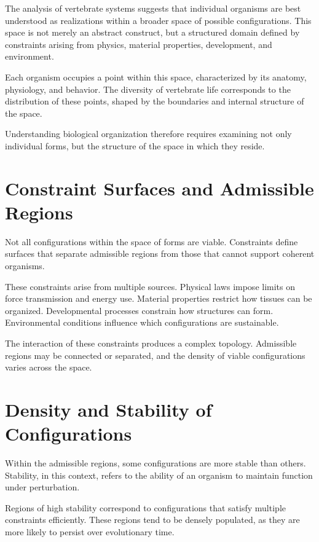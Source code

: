 \documentclass[11pt,oneside]{book}
\begin{document}
The analysis of vertebrate systems suggests that individual organisms are best understood as realizations within a broader space of possible configurations. This space is not merely an abstract construct, but a structured domain defined by constraints arising from physics, material properties, development, and environment.

Each organism occupies a point within this space, characterized by its anatomy, physiology, and behavior. The diversity of vertebrate life corresponds to the distribution of these points, shaped by the boundaries and internal structure of the space.

Understanding biological organization therefore requires examining not only individual forms, but the structure of the space in which they reside.

\section{Constraint Surfaces and Admissible Regions}

Not all configurations within the space of forms are viable. Constraints define surfaces that separate admissible regions from those that cannot support coherent organisms.

These constraints arise from multiple sources. Physical laws impose limits on force transmission and energy use. Material properties restrict how tissues can be organized. Developmental processes constrain how structures can form. Environmental conditions influence which configurations are sustainable.

The interaction of these constraints produces a complex topology. Admissible regions may be connected or separated, and the density of viable configurations varies across the space.

\section{Density and Stability of Configurations}

Within the admissible regions, some configurations are more stable than others. Stability, in this context, refers to the ability of an organism to maintain function under perturbation.

Regions of high stability correspond to configurations that satisfy multiple constraints efficiently. These regions tend to be densely populated, as they are more likely to persist over evolutionary time.
\end{document}
